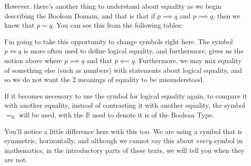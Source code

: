 However, there's another thing to understand about equality as we begin describing the Boolean Domain, and that is that if $p \implies q$ and $p \implies q$, then we know that $p = q$. You can see this from the following tables:

\begin{table}[ht]
\centering
{}
\quad
{}
\caption{Tables for Describing Logical Equality}
\end{table}

I'm going to take this opportunity to change symbols right here. The symbol $p \iff q$ is more often used to define logical equality, and furthermore, gives us the notion above where $p \implies q$ and that $p \impliedby q$. Furthermore, we may mix equality of something else (such as numbers) with statements about logical equality, and so we do not want the 2 meanings of equality to be misunderstood.

If it becomes necessary to use the symbol for logical equality again, to compare it with another equality, instead of contrasting it with another equality, the symbol $=_{\mathbb{B}}$ will be used, with the $\mathbb{B}$ used to denote it is of the Boolean Type.

You'll notice a little difference here with this too. We are using a symbol that is symmetric, horizontally, and although we cannot say this about \emph{every} symbol in mathematics, in the introductory parts of these texts, we will tell you when they are not.

